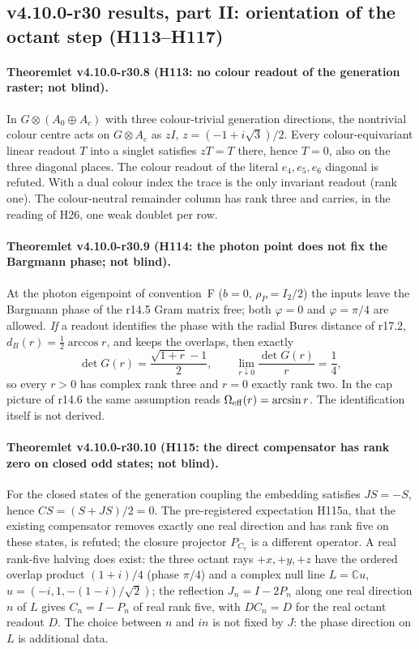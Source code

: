 \subsection*{v4.10.0-r30 results, part II: orientation of the octant step (H113--H117)}
\label{subsec:v4100-r30-results-op3}

\paragraph{Theoremlet v4.10.0-r30.8 (H113: no colour readout of the generation raster; not blind).}
In \(G\otimes(A_0\oplus A_c)\) with three colour-trivial generation directions, the nontrivial colour centre acts on \(G\otimes A_c\) as \(zI\),
\(z=(-1+i\sqrt3)/2\).  Every colour-equivariant linear readout \(T\) into a singlet satisfies \(zT=T\) there, hence \(T=0\), also on the three
diagonal places.  The colour readout of the literal \(e_4,e_5,e_6\) diagonal is refuted.  With a dual colour index the trace is the only invariant
readout (rank one).  The colour-neutral remainder column has rank three and carries, in the reading of H26, one weak doublet per row.

\paragraph{Theoremlet v4.10.0-r30.9 (H114: the photon point does not fix the Bargmann phase; not blind).}
At the photon eigenpoint of convention~F (\(b=0\), \(\rho_P=I_2/2\)) the inputs leave the Bargmann phase of the r14.5 Gram matrix free; both
\(\varphi=0\) and \(\varphi=\pi/4\) are allowed.  \emph{If} a readout identifies the phase with the radial Bures distance of r17.2,
\(d_B(r)=\tfrac12\arccos r\), and keeps the overlaps, then exactly
\[
\det G(r)=\frac{\sqrt{1+r}-1}{2},\qquad \lim_{r\downarrow0}\frac{\det G(r)}{r}=\frac14,
\]
so every \(r>0\) has complex rank three and \(r=0\) exactly rank two.  In the cap picture of r14.6 the same assumption reads
\(\Omega_{\rm eff}(r)=\arcsin r\).  The identification itself is not derived.

\paragraph{Theoremlet v4.10.0-r30.10 (H115: the direct compensator has rank zero on closed odd states; not blind).}
For the closed states of the generation coupling the embedding satisfies \(JS=-S\), hence \(CS=(S+JS)/2=0\).  The pre-registered expectation H115a,
that the existing compensator removes exactly one real direction and has rank five on these states, is refuted; the closure projector \(P_{C_7}\) is
a different operator.  A real rank-five halving does exist: the three
octant rays \(+x,+y,+z\) have the ordered overlap product \((1+i)/4\) (phase \(\pi/4\)) and a complex null line \(L=\mathbb Cu\),
\(u=(-i,1,-(1-i)/\sqrt2)\); the reflection \(J_n=I-2P_n\) along one real direction \(n\) of \(L\) gives \(C_n=I-P_n\) of real rank five, with
\(DC_n=D\) for the real octant readout \(D\).  The choice between \(n\) and \(in\) is not fixed by \(J\): the phase direction on \(L\) is
additional data.

